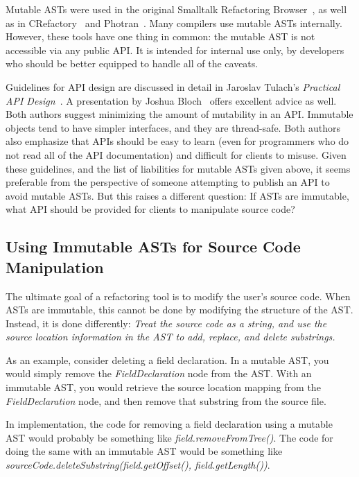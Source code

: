 \documentclass[prodmode]{acmlarge}
\begin{document}
Mutable ASTs were used in the original Smalltalk Refactoring
Browser~\cite{roberts97refactoring}, as well as in
CRefactory~\cite{garrido05program} and Photran~\cite{sle2008}.  Many compilers
use mutable ASTs internally.  However, these tools have one thing in common:
the mutable AST is not accessible via any public API.  It is intended for
internal use only, by developers who should be better equipped to handle all of
the caveats.

Guidelines for API design are discussed in detail in Jaroslav Tulach's
\textit{Practical API Design}~\cite{tulach08practical}.  A presentation by
Joshua Bloch~\cite{bloch} offers excellent advice as well.  Both authors
suggest minimizing the amount of mutability in an API.  Immutable objects tend
to have simpler interfaces, and they are thread-safe.  Both authors also
emphasize that APIs should be easy to learn (even for programmers who do not
read all of the API documentation) and difficult for clients to misuse.  Given
these guidelines, and the list of liabilities for mutable ASTs given above, it
seems preferable from the perspective of someone attempting to publish an API
to avoid mutable ASTs.  But this raises a different question: If ASTs are
immutable, what API should be provided for clients to manipulate source code?

\subsection{Using Immutable ASTs for Source Code Manipulation}
\label{ss:manip}

The ultimate goal of a refactoring tool is to modify the user's source code.
When ASTs are immutable, this cannot be done by modifying the structure of the
AST.  Instead, it is done differently: \textit{Treat the source code as a
string, and use the source location information in the AST to add, replace, and
delete substrings.}

As an example, consider deleting a field declaration.  In a mutable AST, you
would simply remove the \textit{FieldDeclaration} node from the AST.  With an
immutable AST, you would retrieve the source location mapping from the
\textit{FieldDeclaration} node, and then remove that substring from the source
file.

In implementation, the code for removing a field declaration using a mutable
AST would probably be something like \textit{field.removeFromTree()}.  The code
for doing the same with an immutable AST would be something like
\textit{sourceCode.deleteSubstring(field.getOffset(), field.getLength())}.
\end{document}
